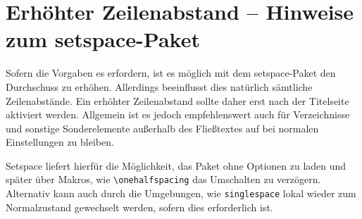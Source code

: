 \documentclass[
	german,%
	accentcolor=9c,%
	ruledheaders=chapter,%
	class=book,%
	thesis={%
			type=dr,
			dr=rernat
		},
	fontsize=11pt,%
	parskip=half-,%
	custommargins=true,%
	marginpar=false,%
]{tudapub}
\newcommand*{\code}[1]{\texttt{#1}}
\let\tbs\textbackslash
\begin{document}
\section{Erhöhter Zeilenabstand -- Hinweise zum setspace-Paket}
Sofern die Vorgaben es erfordern, ist es möglich mit dem setspace-Paket den Durchschuss zu erhöhen. Allerdings beeinflusst dies natürlich sämtliche Zeilenabstände. Ein erhöhter Zeilenabstand sollte daher erst nach der Titelseite aktiviert werden. Allgemein ist es jedoch empfehlenswert auch für Verzeichnisse und sonstige Sonderelemente außerhalb des Fließtextes auf bei normalen Einstellungen zu bleiben.

Setspace liefert hierfür die Möglichkeit, das Paket ohne Optionen zu laden und später über Makros, wie \code{\tbs{}onehalfspacing} das Umschalten zu verzögern. Alternativ kann auch durch die Umgebungen, wie \code{singlespace} lokal wieder zum Normalzustand gewechselt werden, sofern dies erforderlich ist.

\printbibliography
\end{document}
